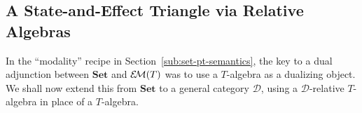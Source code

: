 \documentclass[9pt, preprint]{sigplanconf}
\theoremstyle{theorem}
\newtheorem{proposition}[theorem]{Proposition}
\theoremstyle{definition}
\newcommand{\memo}[1]{\textcolor{red}{(#1)}}
\newcommand{\cat}[1]{\mathcal{#1}}
\newcommand{\place}{{-}}
\newcommand{\Set}{\mathbf{Set}}
\newcommand{\Sets}{\Set}
\newcommand{\EM}{\mathcal{E}{\kern-.5ex}\mathcal{M}}
\newif\ifignore \ignorefalse
\newcommand{\auxproof}[1]{
\ifignore\mbox{}\newline
\textbf{BEGIN: AUX-PROOF} \dotfill\newline
{#1}\mbox{}\newline
\textbf{END: AUX-PROOF}\dotfill\newline
\fi}
\begin{document}
\auxproof{
The following  alternative characterization of
 $\cat{D}$-relative $T$-algebras will be used later.
Its proof is straightforward.
\begin{proposition}
  A natural transformation
  $\tau \colon T \to \cat{D}(A^{(\place)}, A)$
  is a monad map if and only if
  $\alpha^{\sharp} \colon A^{X} \to A^{TX}$
  makes the following diagrams commute: \memo{really?}
  \begin{align*}
    \xymatrix@R-1.8em{
      A^X \ar@{=}[rd] \ar[r]^-{\alpha_X^{\sharp}}
      & A^{TX} \ar@<-0.4em>[d]^-{\eta_X^*} \\
      & A^X
    }
   \quad
    \xymatrix@R-1.8em{
      A^X \ar[r]^-{\alpha^{\sharp}_X}
        \ar@<-0.4em>[d]_-{\alpha^{\sharp}_X}
      & A^{TX} \ar@<-0.8em>[d]^-{\mu^*_X} \\
      A^{TX} \ar[r]^-{\alpha^{\sharp}_{TX}}
      & A^{T^2 X} \\
    }
  \end{align*}
\end{proposition}

\vspace{-1.6em}
\qed
}

\subsection{A State-and-Effect Triangle via Relative Algebras}
\label{sub:state-effect-triangle-relative}

In the ``modality'' recipe in Section~\ref{sub:set-pt-semantics},
the key to  a dual adjunction
between $\Set$ and $\EM(T)$
was to use a $T$-algebra as a dualizing object.
We shall now  extend this from $\Sets$ to a general category $\cat{D}$,
using
 a $\cat{D}$-relative $T$-algebra
in place of a $T$-algebra.
\end{document}

